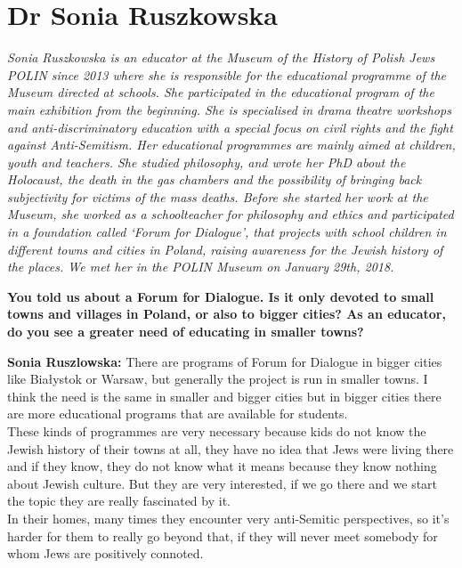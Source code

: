 \section{Dr Sonia Ruszkowska}

\textit{Sonia Ruszkowska is an educator at the Museum of the History of Polish Jews POLIN since 2013 where she is responsible for the educational programme of the Museum directed at schools. She participated in the educational program of the main exhibition from the beginning. She is specialised in drama theatre workshops and anti-discriminatory education with a special focus on civil rights and the fight against Anti-Semitism. Her educational programmes are mainly aimed at children, youth and teachers. She studied philosophy, and wrote her PhD about the Holocaust, the death in the gas chambers and the possibility of bringing back subjectivity for victims of the mass deaths. Before she started her work at the Museum, she worked as a schoolteacher for philosophy and ethics and participated in a foundation called ‘Forum for Dialogue’, that projects with school children in different towns and cities in Poland, raising awareness for the Jewish history of the places. We met her in the POLIN Museum on January 29th, 2018.}\par  
\vspace*{2em}
\textbf{You told us about a Forum for Dialogue. Is it only devoted to small towns and villages in Poland, or also to bigger cities? As an educator, do you see a greater need of educating in smaller towns?} 

\textbf{Sonia Ruszlowska:} There are programs of Forum for Dialogue in bigger cities like Białystok or Warsaw, but generally the project is run in smaller towns. I think the need is the same in smaller and bigger cities but in bigger cities there are more educational programs that are available for students.\\
These kinds of programmes are very necessary because kids do not know the Jewish history of their towns at all, they have no idea that Jews were living there and if they know, they do not know what it means because they know nothing about Jewish culture. But they are very interested, if we go there and we start the topic they are really fascinated by it.\\
In their homes, many times they encounter very anti-Semitic perspectives, so it’s harder for them to really go beyond that, if they will never meet somebody for whom Jews are positively connoted. 


